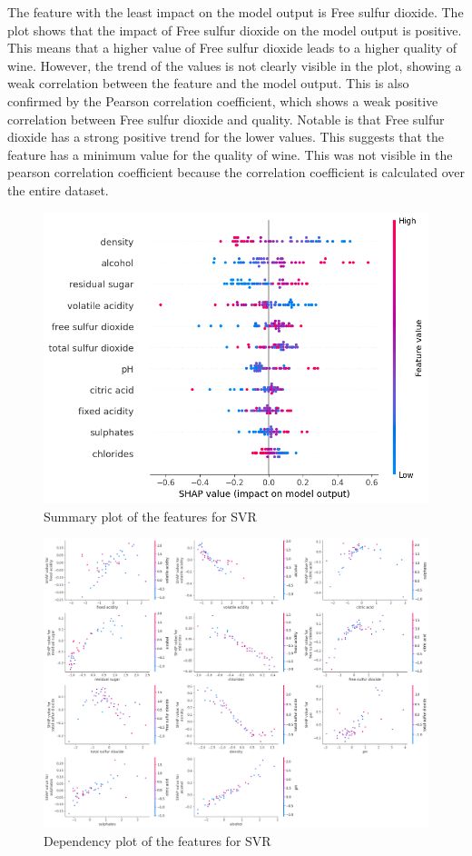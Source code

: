 \documentclass{article}
\begin{document}
The feature with the least impact on the model output is Free sulfur dioxide.
The plot shows that the impact of Free sulfur dioxide on the model output is positive.
This means that a higher value of Free sulfur dioxide leads to a higher quality of wine.
However, the trend of the values is not clearly visible in the plot, showing a weak correlation between the feature and the model output.
This is also confirmed by the Pearson correlation coefficient, which shows a weak positive correlation between Free sulfur dioxide and quality.
Notable is that Free sulfur dioxide has a strong positive trend for the lower values. This suggests that the feature has a minimum value for the quality of wine.
This was not visible in the pearson correlation coefficient because the correlation coefficient is calculated over the entire dataset.

\begin{figure}
	\centering
	\includegraphics[width=\linewidth]{figures/shap-summary-svr.png}
	\caption{Summary plot of the features for SVR}
	\label{fig:summary-plot-svr}
\end{figure}

\begin{figure}
    \centering
    \includegraphics[width=\linewidth]{figures/shap-dependency-svr.png}
    \caption{Dependency plot of the features for SVR}
    \label{fig:dependency-plot-svr}
\end{figure}
\end{document}
